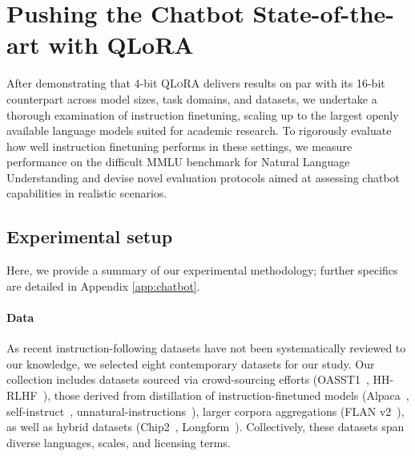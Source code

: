 \section{Pushing the Chatbot State-of-the-art with QLoRA}
\label{sec:pushing}
After demonstrating that 4-bit \textsc{QLoRA} delivers results on par with its 16-bit counterpart across model sizes, task domains, and datasets, we undertake a thorough examination of instruction finetuning, scaling up to the largest openly available language models suited for academic research. To rigorously evaluate how well instruction finetuning performs in these settings, we measure performance on the difficult MMLU benchmark for Natural Language Understanding and devise novel evaluation protocols aimed at assessing chatbot capabilities in realistic scenarios.

\subsection{Experimental setup} Here, we provide a summary of our experimental methodology; further specifics are detailed in Appendix \ref{app:chatbot}. 

\paragraph{Data} As recent instruction-following datasets have not been systematically reviewed to our knowledge, we selected eight contemporary datasets for our study. Our collection includes datasets sourced via crowd-sourcing efforts (OASST1~\citep{kopf2023openassistant}, HH-RLHF~\citep{bai2022training}), those derived from distillation of instruction-finetuned models (Alpaca~\citep{alpaca}, self-instruct~\citep{wang2022self}, unnatural-instructions~\citep{honovich2022unnatural}), larger corpora aggregations (FLAN v2~\citep{chung2022scaling}), as well as hybrid datasets (Chip2~\citep{laion2023}, Longform~\citep{koksal2023longform}). Collectively, these datasets span diverse languages, scales, and licensing terms.

